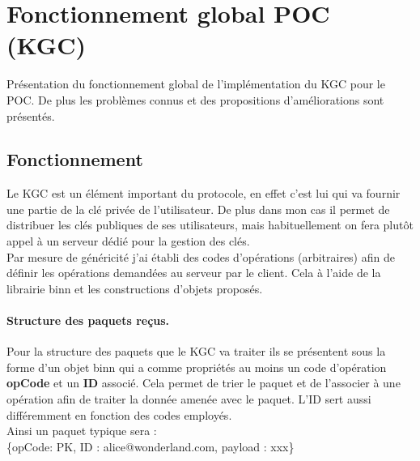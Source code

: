 \section{Fonctionnement global POC (KGC)}
Présentation du fonctionnement global de l'implémentation du KGC pour le POC. De plus les problèmes connus et des propositions d'améliorations sont présentés.
\subsection{Fonctionnement}
Le KGC est un élément important du protocole, en effet c'est lui qui va fournir une partie de la clé privée de l'utilisateur. De plus dans mon cas il permet de distribuer les clés publiques de ses utilisateurs, mais habituellement on fera plutôt appel à un serveur dédié pour la gestion des clés.\\
Par mesure de généricité j'ai établi des codes d'opérations (arbitraires) afin de définir les opérations demandées au serveur par le client. Cela à l'aide de la librairie binn et les constructions d'objets proposés.\\
\paragraph*{Structure des paquets reçus.}
Pour la structure des paquets que le KGC va traiter ils se présentent sous la forme d'un objet binn qui a comme propriétés au moins un code d'opération \textbf{opCode} et un \textbf{ID} associé. Cela permet de trier le paquet et de l'associer à une opération afin de traiter la donnée amenée avec le paquet. L'ID sert aussi différemment en fonction des codes employés.\\
Ainsi un paquet typique sera : \\
\{opCode: PK, ID : alice@wonderland.com, payload : xxx\}

